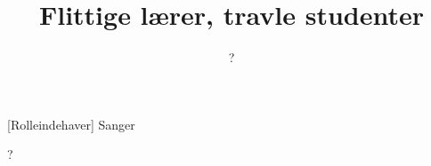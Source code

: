 \documentclass[a4paper,11pt]{article}
\title{Flittige lærer, travle studenter}
\author{?}
\begin{document}
\maketitle

\begin{roles}  
[Rolleindehaver] Sanger
\end{roles}

?
\end{document}

